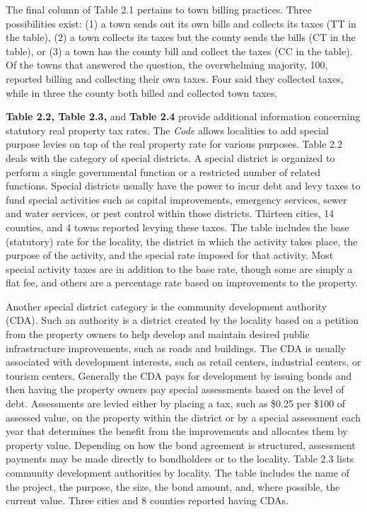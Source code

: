 \documentclass[
]{book}
\begin{document}
The final column of Table 2.1 pertains to town billing practices. Three possibilities exist: (1) a town sends out its own bills and collects its taxes (TT in the table), (2) a town collects its taxes but the county sends the bills (CT in the table), or (3) a town has the county bill and collect the taxes (CC in the table). Of the towns that answered the question, the overwhelming majority, 100, reported billing and collecting their own taxes. Four said they collected taxes, while in three the county both billed and collected town taxes.

\textbf{Table 2.2, Table 2.3,} and \textbf{Table 2.4} provide additional information concerning statutory real property tax rates. The \emph{Code} allows localities to add special purpose levies on top of the real property rate for various purposes. Table 2.2 deals with the category of special districts. A special district is organized to perform a single governmental function or a restricted number of related functions. Special districts usually have the power to incur debt and levy taxes to fund special activities such as capital improvements, emergency services, sewer and water services, or pest control within those districts. Thirteen cities, 14 counties, and 4 towns reported levying these taxes. The table includes the base (statutory) rate for the locality, the district in which the activity takes place, the purpose of the activity, and the special rate imposed for that activity. Most special activity taxes are in addition to the base rate, though some are simply a flat fee, and others are a percentage rate based on improvements to the property.

Another special district category is the community development authority (CDA). Such an authority is a district created by the locality based on a petition from the property owners to help develop and maintain desired public infrastructure improvements, such as roads and buildings. The CDA is usually associated with development interests, such as retail centers, industrial centers, or tourism centers. Generally the CDA pays for development by issuing bonds and then having the property owners pay special assessments based on the level of debt. Assessments are levied either by placing a tax, such as \$0.25 per \$100 of assessed value, on the property within the district or by a special assessment each year that determines the benefit from the improvements and allocates them by property value. Depending on how the bond agreement is structured, assessment payments may be made directly to bondholders or to the locality. Table 2.3 lists community development authorities by locality. The table includes the name of the project, the purpose, the size, the bond amount, and, where possible, the current value. Three cities and 8 counties reported having CDAs.
\end{document}
